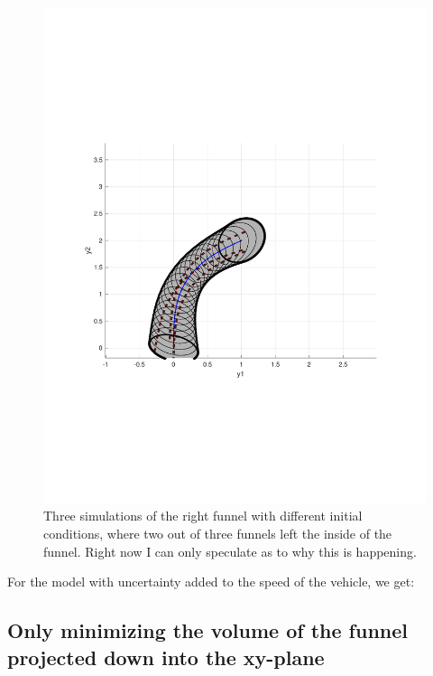 \begin{figure}
  \includegraphics[scale=0.5]{figures/funnel/right_simulation}
  \caption{Three simulations of the right funnel with different initial
    conditions, where two out of three funnels left the inside of the funnel.
    Right now I can only speculate as to why this is happening.}
\end{figure}

For the model with uncertainty added to the speed of the vehicle, we get:

\subsection{Only minimizing the volume of the funnel projected down into the
  xy-plane}

